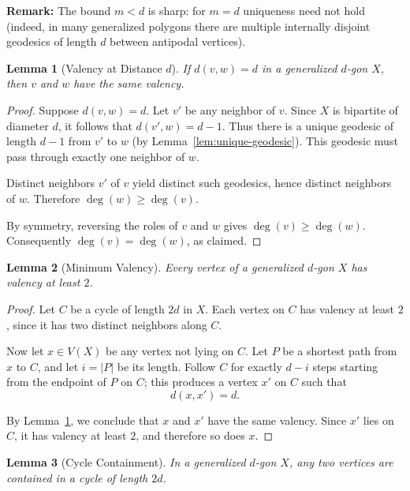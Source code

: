 \documentclass[12pt,a4paper,openany]{book}
\newtheorem{lemma}{Lemma}[section]
\begin{document}
\noindent\textbf{Remark:}
The bound $m<d$ is sharp: for $m=d$ uniqueness need not hold (indeed, in many generalized polygons there are multiple internally disjoint geodesics of length $d$ between antipodal vertices).

\begin{lemma}[Valency at Distance $d$]\label{lem:valency-distance-d}
If $d(v,w) = d$ in a generalized $d$-gon $X$, then $v$ and $w$ have the same valency.
\end{lemma}

\begin{proof}
Suppose $d(v,w) = d$.  
Let $v'$ be any neighbor of $v$.  
Since $X$ is bipartite of diameter $d$, it follows that $d(v',w) = d-1$.  
Thus there is a unique geodesic of length $d-1$ from $v'$ to $w$ (by Lemma~\ref{lem:unique-geodesic}).  
This geodesic must pass through exactly one neighbor of $w$.  

Distinct neighbors $v'$ of $v$ yield distinct such geodesics, hence distinct neighbors of $w$.  
Therefore $\deg(w) \geq \deg(v)$.  

By symmetry, reversing the roles of $v$ and $w$ gives $\deg(v) \geq \deg(w)$.  
Consequently $\deg(v) = \deg(w)$, as claimed.
\end{proof}

\begin{lemma}[Minimum Valency]\label{lem:min-valency}
Every vertex of a generalized $d$-gon $X$ has valency at least $2$.
\end{lemma}

\begin{proof}
Let $C$ be a cycle of length $2d$ in $X$.  
Each vertex on $C$ has valency at least $2$, since it has two distinct neighbors along $C$.  

Now let $x \in V(X)$ be any vertex not lying on $C$.  
Let $P$ be a shortest path from $x$ to $C$, and let $i = |P|$ be its length.  
Follow $C$ for exactly $d-i$ steps starting from the endpoint of $P$ on $C$; this produces a vertex $x'$ on $C$ such that
\[
d(x,x') = d.
\]

By Lemma~\ref{lem:valency-distance-d}, we conclude that $x$ and $x'$ have the same valency.  
Since $x'$ lies on $C$, it has valency at least $2$, and therefore so does $x$.  
\end{proof}

\begin{lemma}[Cycle Containment]\label{lem:cycle-containment}
In a generalized $d$-gon $X$, any two vertices are contained in a cycle of length $2d$.
\end{lemma}
\end{document}
